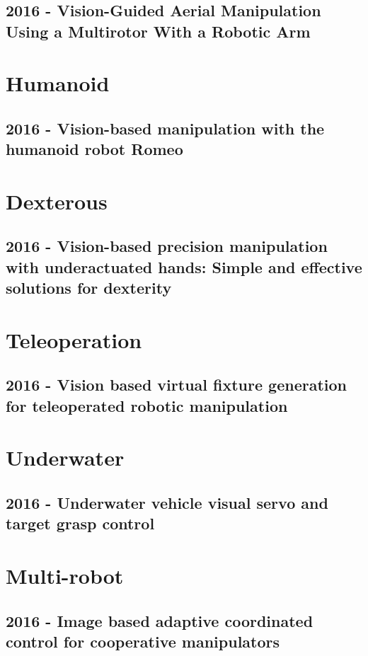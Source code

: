 \subsection{2016 - Vision-Guided Aerial Manipulation Using a Multirotor With a Robotic Arm}

\section{Humanoid} \label{humanoid}
\subsection{2016 - Vision-based manipulation with the humanoid robot Romeo}

\section{Dexterous}
\subsection{2016 - Vision-based precision manipulation with underactuated hands: Simple and effective solutions for dexterity}


\section{Teleoperation}
\subsection{2016 - Vision based virtual fixture generation for teleoperated robotic manipulation}


\section{Underwater}
\subsection{2016 - Underwater vehicle visual servo and target grasp control}


\section{Multi-robot}
\subsection{2016 - Image based adaptive coordinated control for cooperative manipulators}

